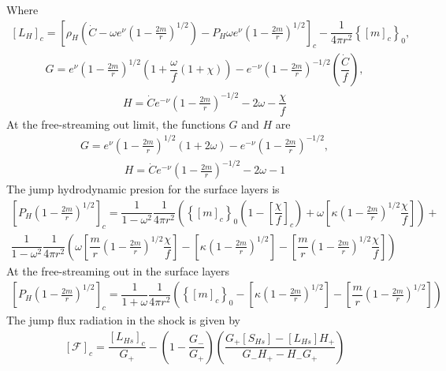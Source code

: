 \documentclass[notitlepage,letterpaper, 10pt]{article}
\begin{document}
Where 
\begin{eqnarray*}
\left[L_{H}\right]_{c} = \left[ \rho_{H}\left(  \dot{C}- \omega e^{\nu}\left(1-\frac{2m}{r} \right)^{1/2}\right) - P_{H}\omega e^{\nu}\left(1-\frac{2m}{r} \right)^{1/2}\right]_{c} -  \dfrac{1}{4\pi r^{2}} \left\lbrace \left[ m \right]_c \right\rbrace_0,
\end{eqnarray*}
\begin{eqnarray*}
G= e^{\nu}\left(1-\frac{2m}{r} \right)^{1/2}\left(1+\dfrac{\omega}{f}\left( 1+\chi\right) \right)-e^{-\nu}\left(1-\frac{2m}{r} \right)^{-1/2}\left( \dfrac{\dot{C}}{f}\right),
\end{eqnarray*}
\begin{eqnarray*}
H= \dot{C}e^{-\nu}\left(1-\frac{2m}{r} \right)^{-1/2}-2\omega-\dfrac{\chi}{f}
\end{eqnarray*}
At the free-streaming out limit, the functions $G$ and $H$ are 
\begin{eqnarray}
G= e^{\nu}\left(1-\frac{2m}{r} \right)^{1/2}\left(1+2\omega \right)-e^{-\nu}\left(1-\frac{2m}{r} \right)^{-1/2},
\end{eqnarray}
\begin{eqnarray}
H= \dot{C}e^{-\nu}\left(1-\frac{2m}{r} \right)^{-1/2}-2\omega-1
\end{eqnarray}
The jump hydrodynamic presion for the surface layers is
\begin{eqnarray}
\left[P_{H}\left(1-\frac{2m}{r} \right)^{1/2} \right]_{c}= \dfrac{1}{1-\omega^{2}}\dfrac{1}{4\pi r^{2}}\left( \left\lbrace \left[ m \right]_c \right\rbrace_0 \left(1-\left[\dfrac{\chi}{f} \right]_{c} \right)+\omega\left[\kappa \left(1-\frac{2m}{r} \right)^{1/2}\dfrac{\chi}{f} \right]\right)+\nonumber \\ \dfrac{1}{1-\omega^{2}}\dfrac{1}{4\pi r^{2}}\left(\omega\left[\dfrac{m}{r} \left(1-\frac{2m}{r} \right)^{1/2}\dfrac{\chi}{f} \right]-\left[\kappa \left(1-\frac{2m}{r} \right)^{1/2} \right]-\left[\dfrac{m}{r} \left(1-\frac{2m}{r} \right)^{1/2}\dfrac{\chi}{f} \right]  \right)
\end{eqnarray}
At the free-streaming out in the surface layers 
\begin{eqnarray}
\left[P_{H}\left(1-\frac{2m}{r} \right)^{1/2} \right]_{c}= \dfrac{1}{1+\omega}\dfrac{1}{4\pi r^{2}}\left( \left\lbrace \left[ m \right]_c \right\rbrace_0-\left[\kappa \left(1-\frac{2m}{r} \right)^{1/2} \right]-\left[\dfrac{m}{r} \left(1-\frac{2m}{r} \right)^{1/2} \right]\right)
\end{eqnarray}
The jump flux radiation in the shock is given by 
\begin{eqnarray}
\left[ \mathcal{F} \right]_{c}= \dfrac{\left[ L_{Hs} \right]_{c}}{G_{+}}- \left(1- \dfrac{G_{-}}{G_{+}} \right)\left( \dfrac{G_{+}\left[S_{Hs}\right]- \left[L_{Hs} \right]H_{+}}{G_{-}H_{+}-H_{-}G_{+}}  \right)
\end{eqnarray}
\end{document}
